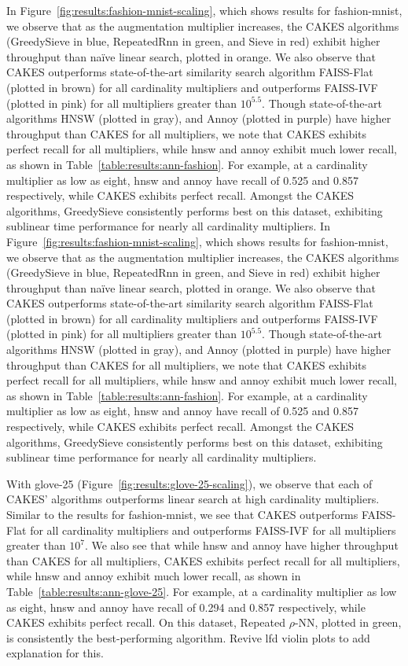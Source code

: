 In Figure~\ref{fig:results:fashion-mnist-scaling}, which shows results for fashion-mnist, we observe that as the augmentation multiplier increases, the CAKES algorithms (GreedySieve in blue, RepeatedRnn in green, and Sieve in red) exhibit higher throughput than na\"{i}ve linear search, plotted in orange. We also observe that CAKES outperforms state-of-the-art similarity search algorithm FAISS-Flat (plotted in brown) for all cardinality multipliers and outperforms FAISS-IVF (plotted in pink) for all multipliers greater than $10^{5.5}$. Though state-of-the-art algorithms HNSW (plotted in gray), and Annoy (plotted in purple) have higher throughput than CAKES for all multipliers, we note that CAKES exhibits perfect recall for all multipliers, while hnsw and annoy exhibit much lower recall, as shown in Table~\ref{table:results:ann-fashion}. For example, at a cardinality multiplier as low as eight, hnsw and annoy have recall of 0.525 and 0.857 respectively, while CAKES exhibits perfect recall.
Amongst the CAKES algorithms, GreedySieve consistently performs best on this dataset, exhibiting sublinear time performance for nearly all cardinality multipliers. 
In Figure~\ref{fig:results:fashion-mnist-scaling}, which shows results for fashion-mnist, we observe that as the augmentation multiplier increases, the CAKES algorithms (GreedySieve in blue, RepeatedRnn in green, and Sieve in red) exhibit higher throughput than na\"{i}ve linear search, plotted in orange. We also observe that CAKES outperforms state-of-the-art similarity search algorithm FAISS-Flat (plotted in brown) for all cardinality multipliers and outperforms FAISS-IVF (plotted in pink) for all multipliers greater than $10^{5.5}$. Though state-of-the-art algorithms HNSW (plotted in gray), and Annoy (plotted in purple) have higher throughput than CAKES for all multipliers, we note that CAKES exhibits perfect recall for all multipliers, while hnsw and annoy exhibit much lower recall, as shown in Table~\ref{table:results:ann-fashion}. For example, at a cardinality multiplier as low as eight, hnsw and annoy have recall of 0.525 and 0.857 respectively, while CAKES exhibits perfect recall.
Amongst the CAKES algorithms, GreedySieve consistently performs best on this dataset, exhibiting sublinear time performance for nearly all cardinality multipliers. 


With glove-25 (Figure~\ref{fig:results:glove-25-scaling}), we observe that each of CAKES' algorithms outperforms linear search at high cardinality multipliers. Similar to the results for fashion-mnist, we see that CAKES outperforms FAISS-Flat for all cardinality multipliers and outperforms FAISS-IVF for all multipliers greater than $10^{7}$. We also see that while hnsw and annoy have higher throughput than CAKES for all multipliers, CAKES exhibits perfect recall for all multipliers, while hnsw and annoy exhibit much lower recall, as shown in Table~\ref{table:results:ann-glove-25}. For example, at a cardinality multiplier as low as eight, hnsw and annoy have recall of 0.294 and 0.857 respectively, while CAKES exhibits perfect recall.
On this dataset, Repeated $\rho$-NN, plotted in green, is consistently the best-performing algorithm. {\color{red} Revive lfd violin plots to add explanation for this.}



